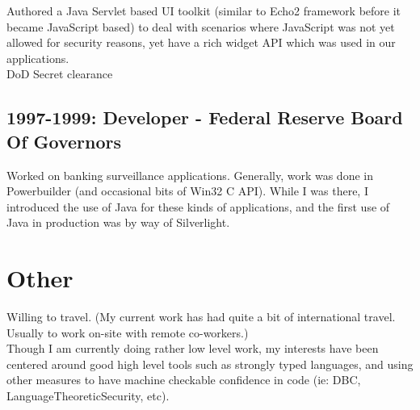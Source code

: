 \documentclass[margin]{res}
\begin{document}
\begin{resume}
Authored a Java Servlet based UI toolkit (similar to Echo2 framework before it became JavaScript based) to deal with scenarios where JavaScript was not yet allowed for security reasons, yet have a rich widget API which was used in our applications. \\
DoD Secret clearance

\subsection{1997-1999: Developer - Federal Reserve Board Of Governors}
Worked on banking surveillance applications.
Generally, work was done in Powerbuilder (and occasional bits of Win32 C API).
While I was there, I introduced the use of Java for these kinds of applications,
and the first use of Java in production was by way of Silverlight.
 
\section{Other}
Willing to travel.  (My current work has had quite a bit of international travel.  Usually to work on-site with remote co-workers.) \\

Though I am currently doing rather low level work, 
my interests have been centered around good high level tools
such as strongly typed languages, and using other measures
to have machine checkable confidence in code (ie: DBC, LanguageTheoreticSecurity, etc). 


 
\end{resume}
\end{document}
